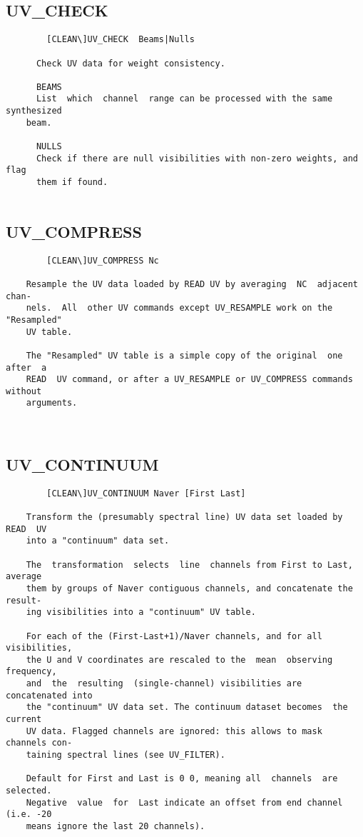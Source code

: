 \subsection{UV\_CHECK}
\begin{verbatim}
        [CLEAN\]UV_CHECK  Beams|Nulls

      Check UV data for weight consistency.

      BEAMS
      List  which  channel  range can be processed with the same synthesized
    beam.

      NULLS
      Check if there are null visibilities with non-zero weights, and flag
      them if found.


\end{verbatim}
\subsection{UV\_COMPRESS}
\begin{verbatim}
        [CLEAN\]UV_COMPRESS Nc

    Resample the UV data loaded by READ UV by averaging  NC  adjacent  chan-
    nels.  All  other UV commands except UV_RESAMPLE work on the "Resampled"
    UV table.

    The "Resampled" UV table is a simple copy of the original  one  after  a
    READ  UV command, or after a UV_RESAMPLE or UV_COMPRESS commands without
    arguments.



\end{verbatim}
\subsection{UV\_CONTINUUM}
\begin{verbatim}
        [CLEAN\]UV_CONTINUUM Naver [First Last]

    Transform the (presumably spectral line) UV data set loaded by  READ  UV
    into a "continuum" data set.

    The  transformation  selects  line  channels from First to Last, average
    them by groups of Naver contiguous channels, and concatenate the result-
    ing visibilities into a "continuum" UV table.

    For each of the (First-Last+1)/Naver channels, and for all visibilities,
    the U and V coordinates are rescaled to the  mean  observing  frequency,
    and  the  resulting  (single-channel) visibilities are concatenated into
    the "continuum" UV data set. The continuum dataset becomes  the  current
    UV data. Flagged channels are ignored: this allows to mask channels con-
    taining spectral lines (see UV_FILTER).

    Default for First and Last is 0 0, meaning all  channels  are  selected.
    Negative  value  for  Last indicate an offset from end channel (i.e. -20
    means ignore the last 20 channels).

\end{verbatim}
